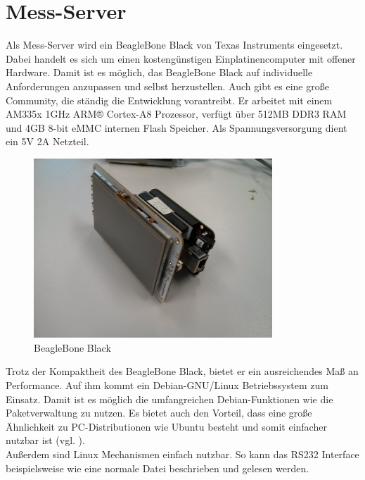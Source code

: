 \section{Mess-Server}
\label{section_Mess-Server}

Als Mess-Server wird ein BeagleBone Black von Texas Instruments eingesetzt. Dabei handelt es sich um einen kostengünstigen Einplatinencomputer mit offener Hardware. Damit ist es möglich, das BeagleBone Black auf individuelle Anforderungen anzupassen und selbst herzustellen. Auch gibt es eine große Community, die ständig die Entwicklung vorantreibt.
Er arbeitet mit einem AM335x 1GHz ARM® Cortex-A8 Prozessor, verfügt über 512MB DDR3 RAM und 4GB 8-bit eMMC internen Flash Speicher. Als Spannungsversorgung dient ein 5V 2A Netzteil.


\begin{figure}[H]
\begin{center}
\includegraphics[width=0.8\textwidth]{img/general/BeagleBoneBlack.jpg}
\caption{BeagleBone Black}
\label{figure_Beagleboneblack}
\end{center}
\end{figure}

Trotz der Kompaktheit des BeagleBone Black, bietet er ein ausreichendes Maß an Performance. Auf ihm kommt ein Debian-GNU/Linux Betriebssystem zum Einsatz. Damit ist es möglich die umfangreichen Debian-Funktionen wie die Paketverwaltung zu nutzen. Es bietet auch den Vorteil, dass eine große Ähnlichkeit zu PC-Distributionen wie Ubuntu besteht und somit einfacher nutzbar ist (vgl. \cite{schroeder2009embedded}).\\
Außerdem sind Linux Mechanismen einfach nutzbar. So kann das RS232 Interface beispielsweise wie eine normale Datei beschrieben und gelesen werden.

